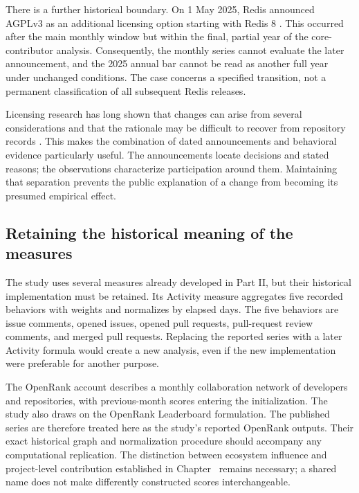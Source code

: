 

There is a further historical boundary. On 1 May 2025, Redis announced AGPLv3 as an additional licensing option starting with Redis 8 \citep{redis2025}. This occurred after the main monthly window but within the final, partial year of the core-contributor analysis. Consequently, the monthly series cannot evaluate the later announcement, and the 2025 annual bar cannot be read as another full year under unchanged conditions. The case concerns a specified transition, not a permanent classification of all subsequent Redis releases.

Licensing research has long shown that changes can arise from several considerations and that the rationale may be difficult to recover from repository records \citep{vendome2017}. This makes the combination of dated announcements and behavioral evidence particularly useful. The announcements locate decisions and stated reasons; the observations characterize participation around them. Maintaining that separation prevents the public explanation of a change from becoming its presumed empirical effect.

\subsection{Retaining the historical meaning of the measures}
The study uses several measures already developed in Part II, but their historical implementation must be retained. Its Activity measure aggregates five recorded behaviors with weights and normalizes by elapsed days. The five behaviors are issue comments, opened issues, opened pull requests, pull-request review comments, and merged pull requests. Replacing the reported series with a later Activity formula would create a new analysis, even if the new implementation were preferable for another purpose.

The OpenRank account describes a monthly collaboration network of developers and repositories, with previous-month scores entering the initialization. The study also draws on the OpenRank Leaderboard formulation. The published series are therefore treated here as the study's reported OpenRank outputs. Their exact historical graph and normalization procedure should accompany any computational replication. The distinction between ecosystem influence and project-level contribution established in Chapter~ remains necessary; a shared name does not make differently constructed scores interchangeable.

